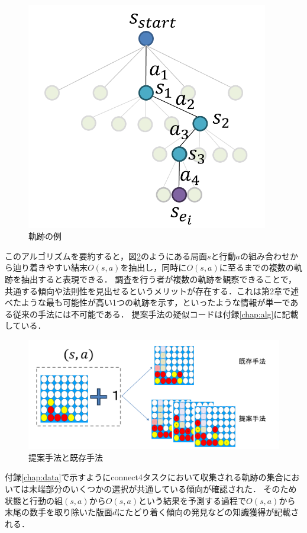 \begin{figure}[t]
    \centering
    \includegraphics[width=300pt]{./figure/traj-example.png}
    \caption{軌跡の例}
    \label{fig:traj-example}
\end{figure}
このアルゴリズムを要約すると，図\ref{fig:merit}のようにある局面$s$と行動$a$の組み合わせから辿り着きやすい結末$O(s, a)$を抽出し，同時に$O(s, a)$に至るまでの複数の軌跡を抽出すると表現できる．
調査を行う者が複数の軌跡を観察できることで，
共通する傾向や法則性を見出せるというメリットが存在する．これは第2章で述べたような最も可能性が高い1つの軌跡を示す，といったような情報が単一である従来の手法には不可能である．
提案手法の疑似コードは付録\ref{chap:alg}に記載している．

\begin{figure}[t]
    \includegraphics[width=400pt]{./figure/merit.png}
	\caption{提案手法と既存手法}
	\label{fig:merit}
\end{figure}




付録\ref{chap:data}で示すようにconnect4タスクにおいて収集される軌跡の集合においては末端部分のいくつかの選択が共通している傾向が確認された．
そのため状態と行動の組$(s, a)$から$O(s, a)$という結果を予測する過程で$O(s, a)$から末尾の数手を取り除いた版面$d$にたどり着く傾向の発見などの知識獲得が記載される．
